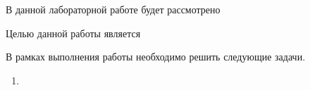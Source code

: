 \Introduction
В данной лабораторной работе будет рассмотрено 

Целью данной работы является 

В рамках выполнения работы необходимо решить следующие задачи.

\begin{enumerate}
	\item 
\end{enumerate}